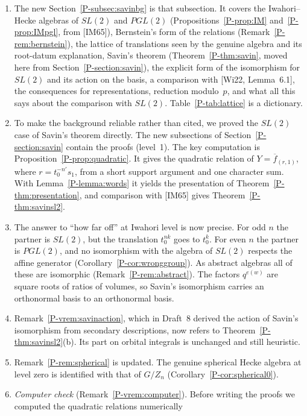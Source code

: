 \documentclass[12pt,letterpaper]{amsart}
\begin{document}
\begin{enumerate}[leftmargin=1.5em]
\item The new Section~\ref{P-subsec:savinbg} is that subsection. It
covers the Iwahori--Hecke algebras of $SL(2)$ and $PGL(2)$
(Propositions~\ref{P-prop:IM} and~\ref{P-prop:IMpgl}, from [IM65]),
Bernstein's form of the relations (Remark~\ref{P-rem:bernstein}), the
lattice of translations seen by the genuine algebra and its root-datum
explanation, Savin's theorem (Theorem~\ref{P-thm:savin}, moved here
from Section~\ref{P-section:savin}), the explicit form of the
isomorphism for $SL(2)$ and its action on the basis, a comparison with
[Wi22, Lemma~6.1], the consequences for representations, reduction
modulo~$p$, and what all this says about the comparison with $SL(2)$.
Table~\ref{P-tab:lattice} is a dictionary.
\item To make the background reliable rather than cited, we proved the
$SL(2)$ case of Savin's theorem directly. The new subsections of
Section~\ref{P-section:savin} contain the proofs (level~1). The key
computation is Proposition~\ref{P-prop:quadratic}. It gives the
quadratic relation of $Y=\overline f_{(r,1)}$, where $r=t_0^{-n'}s_1$,
from a short support argument and one character sum. With
Lemma~\ref{P-lemma:words} it yields the presentation of
Theorem~\ref{P-thm:presentation}, and comparison with [IM65] gives
Theorem~\ref{P-thm:savinsl2}.
\item The answer to ``how far off'' at Iwahori level is now precise.
For odd $n$ the partner is $SL(2)$, but the translation $t_0^{nk}$ goes
to $t_0^k$. For even $n$ the partner is $PGL(2)$, and no isomorphism
with the algebra of $SL(2)$ respects the affine generator
(Corollary~\ref{P-cor:wronggroup}). As abstract algebras all of these
are isomorphic (Remark~\ref{P-rem:abstract}). The factors $q^{e(w)}$
are square roots of ratios of volumes, so Savin's isomorphism carries
an orthonormal basis to an orthonormal basis.
\item Remark~\ref{P-vrem:savinaction}, which in Draft~8 derived the
action of Savin's isomorphism from secondary descriptions, now refers
to Theorem~\ref{P-thm:savinsl2}(b). Its part on orbital integrals is
unchanged and still heuristic.
\item Remark~\ref{P-rem:spherical} is updated. The genuine spherical
Hecke algebra at level zero is identified with that of $G/Z_n$
(Corollary~\ref{P-cor:spherical0}).
\item \emph{Computer check} (Remark~\ref{P-vrem:computer}). Before
writing the proofs we computed the quadratic relations numerically

\end{enumerate}
\end{document}

